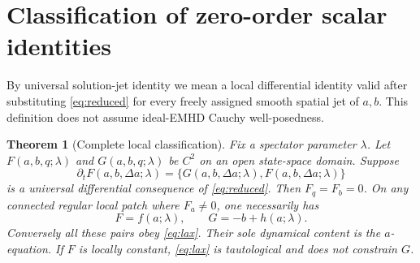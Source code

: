 \documentclass[11pt,a4paper]{article}
\newtheorem{theorem}{Theorem}
\begin{document}
\section{Classification of zero-order scalar identities}
By universal solution-jet identity we mean a local differential
identity valid after substituting \eqref{eq:reduced} for every
freely assigned smooth spatial jet of \(a,b\). This definition does
not assume ideal-EMHD Cauchy well-posedness.

\begin{theorem}[Complete local classification]\label{thm:main}
Fix a spectator parameter \(\lambda\). Let
\(F(a,b,q;\lambda)\) and \(G(a,b,q;\lambda)\) be \(C^2\)
on an open state-space domain. Suppose
\begin{equation}\label{eq:lax}
 \partial_t F(a,b,\Delta a;\lambda)
 =\{G(a,b,\Delta a;\lambda),F(a,b,\Delta a;\lambda)\}
\end{equation}
is a universal differential consequence of \eqref{eq:reduced}.
Then \(F_q=F_b=0\). On any connected regular local patch where
\(F_a\ne0\), one necessarily has
\begin{equation}\label{eq:forms}
 F=f(a;\lambda),\qquad G=-b+h(a;\lambda).
\end{equation}
Conversely all these pairs obey \eqref{eq:lax}.
Their sole dynamical content is the \(a\)-equation. If \(F\)
is locally constant, \eqref{eq:lax} is tautological and
does not constrain \(G\).
\end{theorem}
\end{document}
